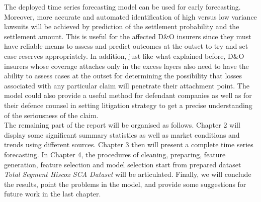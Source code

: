 \indent The deployed time series forecasting model can be used for early forecasting. Moreover, more accurate and automated identification of high versus low variance lawsuits will be achieved by prediction of the settlement probability and the settlement amount. This is useful for the affected D\&O insurers since they must have reliable means to assess and predict outcomes at the outset to try and set case reserves appropriately. In addition, just like what explained before, D\&O insurers whose coverage attaches only in the excess layers also need to have the ability to assess cases at the outset for determining the possibility that losses associated with any particular claim will penetrate their attachment point. The model could also provide a useful method for defendant companies as well as for their defence counsel in setting litigation strategy to get a precise understanding of the seriousness of the claim.\\
\indent The remaining part of the report will be organised as follows. Chapter 2 will display some significant summary statistics as well as market conditions and trends using different sources. Chapter 3 then will present a complete time series forecasting. In Chapter 4, the procedures of cleaning, preparing, feature generation, feature selection and model selection start from prepared dataset \textit{Total Segment Hiscox SCA Dataset} will be articulated. Finally, we will conclude the results, point the problems in the model, and provide some suggestions for future work in the last chapter.  